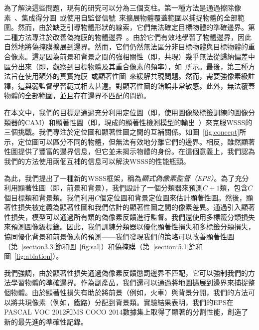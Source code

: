 \documentclass[final]{cvpr}
\begin{document}


為了解決這些問題，現有的研究可以分為三個支柱。第一種方法是通過擦除像素~\cite{choe2020attention,kim2017two, li2018tell}、集成得分圖~\cite{jiang2019integral, lee2019ficklenet}或使用自監督信號~\cite{wang2020self}來擴展物體覆蓋範圍以捕捉物體的全部範圍。然而，由於缺乏引導物體形狀的線索，它們無法確定目標物體的準確邊界。第二種方法專注於改善偽掩膜的物體邊界~\cite{fan2020learning,chen2020boundary}。由於它們有效地學習了物體邊界，因此自然地將偽掩膜擴展到邊界。然而，它們仍然無法區分非目標物體與目標物體的重合像素。這是因為前景和背景之間的強相關性（即，共現）幾乎無法從歸納偏差中區分出來（即，觀察到目標物體及其重合像素的頻率），如~\cite{choe2020evaluating}所示。最後，第三種方法旨在使用額外的真實掩膜~\cite{BMVC2016_92}或顯著性圖~\cite{oh2017exploiting, yao2020saliency}來緩解共現問題。然而，\cite{BMVC2016_92,li2018tell}需要強像素級註釋，這與弱監督學習範式相去甚遠。\cite{oh2017exploiting}對顯著性圖的錯誤非常敏感。此外，\cite{yao2020saliency}無法覆蓋物體的全部範圍，並且存在邊界不匹配的問題。

在本文中，我們的目標是通過充分利用定位圖（即，使用圖像級標籤訓練的圖像分類器的CAM）和顯著性圖（即，現成的顯著性檢測模型的輸出~\cite{hou2017deeply,nguyen2019deepusps,zhao2019pyramid}）來克服WSSS的三個挑戰。我們專注於定位圖和顯著性圖之間的互補關係。如圖~\ref{fig:concept}所示，定位圖可以區分不同的物體，但無法有效地分離它們的邊界。相反，雖然顯著性圖提供了豐富的邊界信息，但它並未揭示物體的身份。在這個意義上，我們認為我們的方法使用兩個互補的信息可以解決WSSS的性能瓶頸。

為此，我們提出了一種新的WSSS框架，稱為\emph{顯式偽像素監督（EPS）}。為了充分利用顯著性圖（即，前景和背景），我們設計了一個分類器來預測$C+1$類，包含$C$個目標類和背景類。我們利用$C$個定位圖和背景定位圖來估計顯著性圖。然後，顯著性損失被定義為顯著性圖和我們估計的顯著性圖之間的像素差異。通過引入顯著性損失，模型可以通過所有類的偽像素反饋進行監督。我們還使用多標籤分類損失來預測圖像級標籤。因此，我們訓練分類器以優化顯著性損失和多標籤分類損失，協同優化背景和前景像素的預測——我們發現我們的策略可以改善顯著性圖（第~\ref{section3.3}節和圖~\ref{fig:sal}）和偽掩膜（第~\ref{section:5.1}節和圖~\ref{fig:ablation}）。

我們強調，由於顯著性損失通過偽像素反饋懲罰邊界不匹配，它可以強制我們的方法學習物體的準確邊界。作為副產品，我們還可以通過將地圖擴展到邊界來捕捉整個物體。由於顯著性損失有助於將前景（例如，火車）與背景分開，我們的方法可以將共現像素（例如，鐵路）分配到背景類。實驗結果表明，我們的EPS在PASCAL VOC 2012和MS COCO 2014數據集上取得了顯著的分割性能，創造了新的最先進的準確性記錄。
\end{document}

